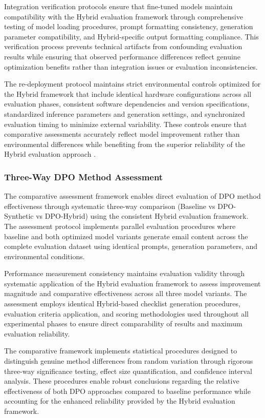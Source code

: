 Integration verification protocols ensure that fine-tuned models maintain compatibility with the Hybrid evaluation framework through comprehensive testing of model loading procedures, prompt formatting consistency, generation parameter compatibility, and Hybrid-specific output formatting compliance. This verification process prevents technical artifacts from confounding evaluation results while ensuring that observed performance differences reflect genuine optimization benefits rather than integration issues or evaluation inconsistencies.

The re-deployment protocol maintains strict environmental controls optimized for the Hybrid framework that include identical hardware configurations across all evaluation phases, consistent software dependencies and version specifications, standardized inference parameters and generation settings, and synchronized evaluation timing to minimize external variability. These controls ensure that comparative assessments accurately reflect model improvement rather than environmental differences while benefiting from the superior reliability of the Hybrid evaluation approach \cite{zhang2024improve_pipeline}.

\subsubsection{Three-Way DPO Method Assessment}

The comparative assessment framework enables direct evaluation of DPO method effectiveness through systematic three-way comparison (Baseline vs DPO-Synthetic vs DPO-Hybrid) using the consistent Hybrid evaluation framework. The assessment protocol implements parallel evaluation procedures where baseline and both optimized model variants generate email content across the complete evaluation dataset using identical prompts, generation parameters, and environmental conditions.

Performance measurement consistency maintains evaluation validity through systematic application of the Hybrid evaluation framework to assess improvement magnitude and comparative effectiveness across all three model variants. The assessment employs identical Hybrid-based checklist generation procedures, evaluation criteria application, and scoring methodologies used throughout all experimental phases to ensure direct comparability of results and maximum evaluation reliability.

The comparative framework implements statistical procedures designed to distinguish genuine method differences from random variation through rigorous three-way significance testing, effect size quantification, and confidence interval analysis. These procedures enable robust conclusions regarding the relative effectiveness of both DPO approaches compared to baseline performance while accounting for the enhanced reliability provided by the Hybrid evaluation framework.

